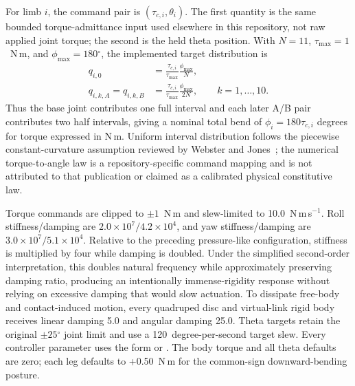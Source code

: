 \documentclass[11pt,letterpaper]{article}
\newcommand{\degrees}{\ensuremath{^{\circ}}}
\begin{document}
For limb $i$, the command pair is $(\tau_{c,i},\theta_i)$. The first quantity
is the same bounded torque-admittance input used elsewhere in this repository,
not raw applied joint torque; the second is the held theta position. With
$N=11$, $\tau_{\max}=1$~N\,m, and $\phi_{\max}=180\degrees{}$, the implemented
target distribution is
\begin{align}
 q_{i,0} &= \frac{\tau_{c,i}}{\tau_{\max}}
             \frac{\phi_{\max}}{N},\\
 q_{i,k,A}=q_{i,k,B} &= \frac{\tau_{c,i}}{\tau_{\max}}
             \frac{\phi_{\max}}{2N},\qquad k=1,\ldots,10.
 \label{eq:quadruped_hybrid_distribution}
\end{align}
Thus the base joint contributes one full interval and each later A/B pair
contributes two half intervals, giving a nominal total bend of
$\phi_i=180\tau_{c,i}$ degrees for torque expressed in N\,m. Uniform interval
distribution follows the piecewise constant-curvature assumption reviewed by
Webster and Jones~\cite{webster2010}; the numerical torque-to-angle law is a
repository-specific command mapping and is not attributed to that publication
or claimed as a calibrated physical constitutive law.

Torque commands are clipped to $\pm1$~N\,m and slew-limited to
10.0~N\,m\,s$^{-1}$. Roll stiffness/damping are
$2.0\times10^7/4.2\times10^4$, and yaw stiffness/damping are
$3.0\times10^7/5.1\times10^4$. Relative to the preceding pressure-like
configuration, stiffness is multiplied by four while damping is doubled.
Under the simplified second-order interpretation, this doubles natural
frequency while approximately preserving damping ratio, producing an
intentionally immense-rigidity response without relying on excessive damping
that would slow actuation. To dissipate free-body and contact-induced motion,
every quadruped disc and virtual-link rigid body receives linear damping 5.0
and angular damping 25.0.
Theta targets retain the original $\pm25\degrees{}$ joint limit and use a
120~degree-per-second target slew. Every controller parameter uses
the form  or . The body torque and
all theta defaults are zero; each leg defaults to +0.50~N\,m for the common-sign
downward-bending posture.
\end{document}
